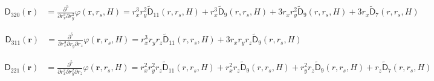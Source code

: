 \begin{align}
  \mathsf{D}_{320}(\mathbf{r}) &= \frac{\partial^5}{\partial r_x^3
    \partial r_y^2} \varphi (\mathbf{r}, r_s, H) =
  r_x^3 r_y^2 \mathsf{\tilde{D}}_{11}(r, r_s, H) +
  r_x^3 \mathsf{\tilde{D}}_{9}(r, r_s, H) +
  3 r_x r_y^2 \mathsf{\tilde{D}}_{9}(r, r_s, H) + 
  3 r_x \mathsf{\tilde{D}}_{7}(r, r_s, H)
  \nonumber
\end{align}

\begin{align}
  \mathsf{D}_{311}(\mathbf{r}) &= \frac{\partial^5}{\partial r_x^3
    \partial r_y \partial r_z} \varphi (\mathbf{r}, r_s, H) =
  r_x^3 r_y r_z \mathsf{\tilde{D}}_{11}(r, r_s, H) +
  3 r_x r_y r_z \mathsf{\tilde{D}}_{9}(r, r_s, H)
  \nonumber
\end{align}

\begin{align}
  \mathsf{D}_{221}(\mathbf{r}) &= \frac{\partial^5}{\partial r_x^2
    \partial r_y^2 \partial r_z} \varphi (\mathbf{r}, r_s, H) =
  r_x^2 r_y^2 r_z \mathsf{\tilde{D}}_{11}(r, r_s, H) +
  r_x^2 r_z \mathsf{\tilde{D}}_{9}(r, r_s, H) +
  r_y^2 r_z \mathsf{\tilde{D}}_{9}(r, r_s, H) +
  r_z \mathsf{\tilde{D}}_{7}(r, r_s, H)
  \nonumber
\end{align}






















